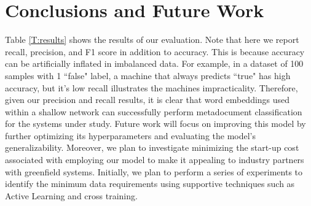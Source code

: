 \documentclass{article}
\begin{document}
\section{Conclusions and Future Work}
    Table \ref{T:results} shows the results of our evaluation. Note that here we report recall, precision, and F1 score in addition to accuracy. This is because accuracy can be artificially inflated in imbalanced data. For example, in a dataset of 100 samples with 1 ``false" label, a machine that always predicts ``true" has high accuracy, but it's low recall illustrates the machines impracticality. Therefore, given our precision and recall results, it is clear that word embeddings used within a shallow network can successfully perform metadocument classification for the systems under study. Future work will focus on improving this model by further optimizing its hyperparameters and evaluating the model's generalizability. Moreover, we plan to investigate minimizing the start-up cost associated with employing our model to make it appealing to industry partners with greenfield systems. Initially, we plan to perform a series of experiments to identify the minimum data requirements using supportive techniques such as Active Learning and cross training. 
    
\newpage



\end{document}
